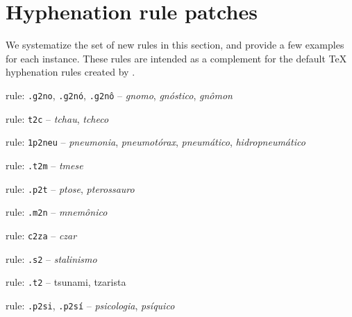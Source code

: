 \section{Hyphenation rule patches}\label{sec-hyph-rpatches}
We systematize the set of new rules in this section, and provide a few examples for
each instance. These rules are intended as a complement for the default \TeX{} hyphenation
rules created by \cite{hyphpt}. 


\begin{rules}
\item\label{rulegrp_gno} rule: \texttt{.g2no}, \texttt{.g2nó}, \texttt{.g2nô} -- \emph{gnomo}, \emph{gnóstico}, \emph{gnômon}

\item\label{rulegrp_tc} rule: \texttt{t2c} -- \emph{tchau}, \emph{tcheco}

\item\label{rulegrp_pneu} rule: \texttt{1p2neu} -- \emph{pneumonia}, \emph{pneumotórax}, \emph{pneumático}, \emph{hidropneumático}

\item\label{rulegrp_tm} rule: \texttt{.t2m} -- \emph{tmese}
   
\item\label{rulegrp_pt} rule: \texttt{.p2t} -- \emph{ptose}, \emph{pterossauro}

\item\label{rulegrp_mn} rule: \texttt{.m2n} -- \emph{mnemônico}

\item\label{rulegrp_cza} rule: \texttt{c2za} -- \emph{czar}

\item\label{rulegrp_s2} rule: \texttt{.s2} -- \emph{stalinismo}

\item\label{rulegrp_t2} rule: \texttt{.t2} -- tsunami, tzarista

\item\label{rulegrp_psi} rule: \texttt{.p2si}, \texttt{.p2sí} -- \emph{psicologia}, \emph{psíquico} %


\end{rules}
